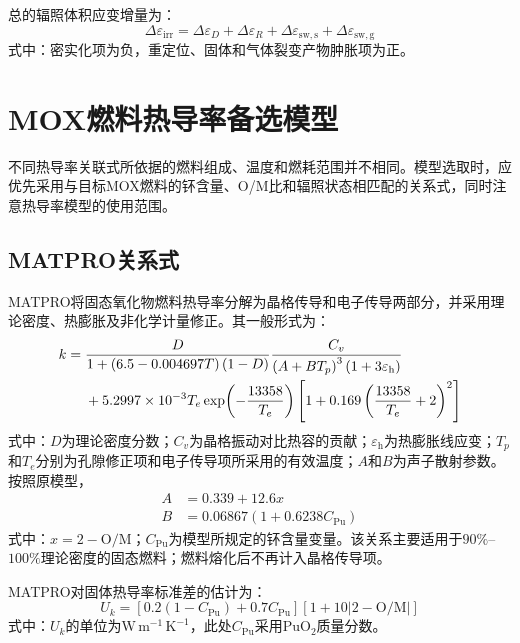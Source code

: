 总的辐照体积应变增量为：
\begin{equation}
	\Delta\varepsilon_{\mathrm{irr}}
	=\Delta\varepsilon_D
	+\Delta\varepsilon_R
	+\Delta\varepsilon_{\mathrm{sw,s}}
	+\Delta\varepsilon_{\mathrm{sw,g}}
	\label{eq:mox_total_irradiation_volumetric_strain}
\end{equation}
\noindent 式中：密实化项为负，重定位、固体和气体裂变产物肿胀项为正。

\section{MOX燃料热导率备选模型}
\label{app:mox_thermal_conductivity_models}

不同热导率关联式所依据的燃料组成、温度和燃耗范围并不相同。模型选取时，应优先采用与目标MOX燃料的钚含量、O/M比和辐照状态相匹配的关系式，同时注意热导率模型的使用范围。

\subsection{MATPRO关系式}

MATPRO将固态氧化物燃料热导率分解为晶格传导和电子传导两部分，并采用理论密度、热膨胀及非化学计量修正。其一般形式为：
\begin{align}
	k={}&
	\frac{D}{1+\left(6.5-0.004697T\right)(1-D)}
	\frac{C_v}{\left(A+BT_p\right)^3\left(1+3\varepsilon_{\mathrm h}\right)}
	\notag\\
	&+5.2997\times10^{-3}T_e
	\exp\!\left(-\frac{13358}{T_e}\right)
	\left[
	1+0.169\left(\frac{13358}{T_e}+2\right)^2
	\right]
	\label{eq:appendix_matpro_thermal_conductivity}
\end{align}
\noindent 式中：$D$为理论密度分数；$C_v$为晶格振动对比热容的贡献；$\varepsilon_{\mathrm h}$为热膨胀线应变；$T_p$和$T_e$分别为孔隙修正项和电子传导项所采用的有效温度；$A$和$B$为声子散射参数。按照原模型，
\begin{equation}
	\begin{aligned}
		A&=0.339+12.6x\\
		B&=0.06867\left(1+0.6238C_{\mathrm{Pu}}\right)
	\end{aligned}
	\label{eq:appendix_matpro_scattering_parameters}
\end{equation}
\label{eq:appendix_matpro_A}
\label{eq:appendix_matpro_B}
\noindent 式中：$x=2-\mathrm{O/M}$；$C_{\mathrm{Pu}}$为模型所规定的钚含量变量。该关系主要适用于$90\%$--$100\%$理论密度的固态燃料；燃料熔化后不再计入晶格传导项。

MATPRO对固体热导率标准差的估计为：
\begin{equation}
	U_k=
	\left[0.2(1-C_{\mathrm{Pu}})+0.7C_{\mathrm{Pu}}\right]
	\left[1+10\left|2-\mathrm{O/M}\right|\right]
	\label{eq:appendix_matpro_thermal_conductivity_uncertainty}
\end{equation}
\noindent 式中：$U_k$的单位为$\mathrm{W\,m^{-1}\,K^{-1}}$，此处$C_{\mathrm{Pu}}$采用$\mathrm{PuO}_2$质量分数。

